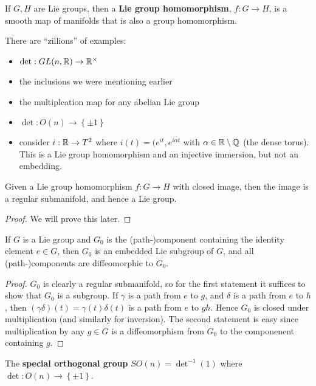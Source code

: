 \documentclass{../mathnotes}
\begin{document}
\begin{defn}
    If $G,H$ are Lie groups, then a \textbf{Lie group homomorphism}, $f:G\to H$, is a smooth map of manifolds that is also a group homomorphism.
\end{defn}
\begin{exmp}
    There are ``zillions'' of examples:
    \begin{itemize}
        \item $\det:GL(n,\mathbb{R})\to\mathbb{R}^\times$
        \item the inclusions we were mentioning earlier
        \item the multiplcation map for any abelian Lie group
        \item $\det:O(n)\to\left\{ \pm 1 \right\}$
        \item consider $i:\mathbb{R}\to T^2$ where $i(t)=(e^{it},e^{i\alpha t}$ with $\alpha\in\mathbb{R}\setminus\mathbb{Q}$ (the dense torus). This is a Lie group homomorphism
            and an injective immersion, but not an embedding.
    \end{itemize}
\end{exmp}

\begin{thm}
    Given a Lie group homomorphism $f:G\to H$ with closed image, then the image is a regular submanifold, and hence a Lie group.
\end{thm}
\begin{proof}
    We will prove this later.
\end{proof}

\begin{prop}
    If $G$ is a Lie group and $G_0$ is the (path-)component containing the identity element $e\in G$, then $G_0$ is an embedded Lie subgroup of $G$,
    and all (path-)components are diffeomorphic to $G_0$.
\end{prop}
\begin{proof}
    $G_0$ is clearly a regular submanifold, so for the first statement it suffices to show that $G_0$ is a subgroup. If $\gamma$ is a path
    from $e$ to $g$, and $\delta$ is a path from $e$ to $h$, then $(\gamma\delta)(t)=\gamma(t)\delta(t)$ is a path from $e$ to $gh$. Hence
    $G_0$ is closed under multiplication (and similarly for inversion). The second statement is easy since multiplication by any $g\in G$ is a
    diffeomorphism from $G_0$ to the componenent containing $g$.
\end{proof}

\begin{defn}
    The \textbf{special orthogonal group} $SO(n)=\det^{-1}(1)$ where $\det:O(n)\to\left\{ \pm 1 \right\}$.
\end{defn}
\end{document}
